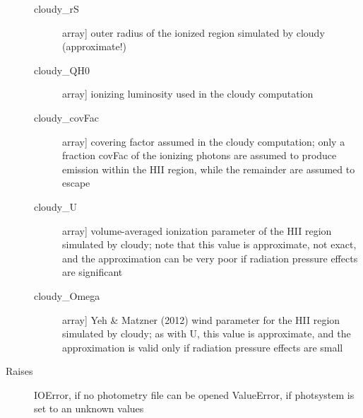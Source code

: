 \documentclass[letterpaper,10pt,english]{sphinxmanual}
\begin{document}
\begin{fulllineitems}
\begin{description}
\begin{description}
\item[{cloudy\_rS}] \leavevmode{[}array{]}
outer radius of the ionized region simulated by cloudy (approximate!)

\item[{cloudy\_QH0}] \leavevmode{[}array{]}
ionizing luminosity used in the cloudy computation

\item[{cloudy\_covFac}] \leavevmode{[}array{]}
covering factor assumed in the cloudy computation; only a
fraction covFac of the ionizing photons are assumed to
produce emission within the HII region, while the remainder
are assumed to escape

\item[{cloudy\_U}] \leavevmode{[}array{]}
volume-averaged ionization parameter of the HII region
simulated by cloudy; note that this value is approximate,
not exact, and the approximation can be very poor if
radiation pressure effects are significant

\item[{cloudy\_Omega}] \leavevmode{[}array{]}
Yeh \& Matzner (2012) wind parameter for the HII region
simulated by cloudy; as with U, this value is approximate,
and the approximation is valid only if radiation pressure
effects are small

\end{description}

\item[{Raises}] \leavevmode
IOError, if no photometry file can be opened
ValueError, if photsystem is set to an unknown values

\end{description}

\end{fulllineitems}

\end{document}
